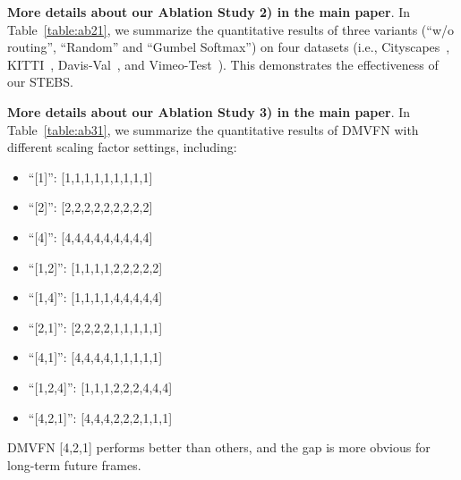 \documentclass[10pt,twocolumn,letterpaper]{article}
\begin{document}
\begin{table*}[th]
\caption{\textbf{Routing Module based on STEBS is effective}. The evaluation metric is MS-SSIM ($\times10^{-2}$).}

\centering
{}
\label{table:ab21}
\end{table*}

\noindent
\textbf{More details about our Ablation Study 2) in the main paper}.
In Table~\ref{table:ab21}, we summarize the quantitative results of three variants (``w/o routing'', ``Random'' and ``Gumbel Softmax'') on four datasets (i.e., Cityscapes~\cite{cityscapes}, KITTI~\cite{kitti}, Davis-Val~\cite{davis}, and Vimeo-Test~\cite{vimeo}). This demonstrates the effectiveness of our STEBS.

\noindent
\textbf{More details about our Ablation Study 3) in the main paper}.
In Table~\ref{table:ab31}, we summarize the quantitative results of DMVFN with different scaling factor settings, including:
\begin{itemize}
\itemsep-0.03in
\item ``[1]'': [1,1,1,1,1,1,1,1,1]
\item ``[2]'': [2,2,2,2,2,2,2,2,2]
\item ``[4]'': [4,4,4,4,4,4,4,4,4]
\item ``[1,2]'': [1,1,1,1,2,2,2,2,2]
\item ``[1,4]'': [1,1,1,1,4,4,4,4,4]
\item ``[2,1]'': [2,2,2,2,1,1,1,1,1]
\item ``[4,1]'': [4,4,4,4,1,1,1,1,1]
\item ``[1,2,4]'': [1,1,1,2,2,2,4,4,4]
\item ``[4,2,1]'': [4,4,4,2,2,2,1,1,1]
\end{itemize}
DMVFN [4,2,1] performs better than others, and the gap is more obvious for long-term future frames. 
\end{document}
